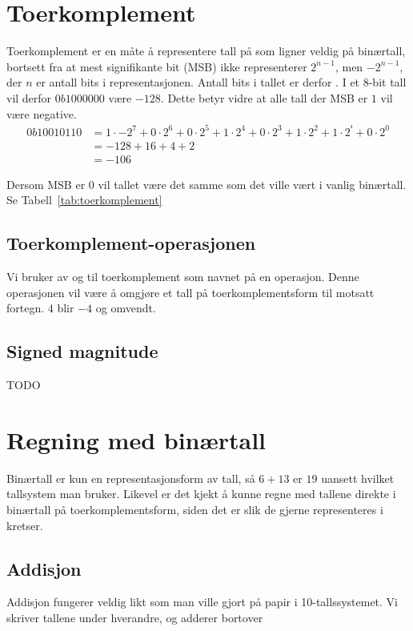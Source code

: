 \documentclass[12pt,a4paper,norsk]{article}
\begin{document}
\section{Toerkomplement}
Toerkomplement er en måte å representere tall på som ligner veldig på binærtall,
bortsett fra at mest signifikante bit (MSB) ikke representerer $2^{n-1}$, men
$-2^{n-1}$, der $n$ er antall bits i representasjonen. Antall bits i tallet er
derfor . I et 8-bit tall vil
derfor $0b1000000$ være $-128$. Dette betyr vidre at alle tall der MSB er $1$
vil være negative.
\begin{align*}
  0b10010110 &= 1 \cdot -2^7 + 0 \cdot 2^6 + 0 \cdot 2^5 + 1 \cdot 2^4 + 0 \cdot 2^3 + 1 \cdot 2^2 + 1 \cdot 2^¹ + 0 \cdot 2^0 \\
             &= -128 + 16 + 4 + 2 \\
             &= -106
\end{align*}

Dersom MSB er $0$ vil tallet være det samme som det ville vært i vanlig
binærtall. Se Tabell~\ref{tab:toerkomplement}

\subsection{Toerkomplement-operasjonen}
Vi bruker av og til toerkomplement som navnet på en operasjon. Denne operasjonen
vil være å omgjøre et tall på toerkomplementsform til motsatt fortegn. $4$ blir
$-4$ og omvendt. 

\subsection{Signed magnitude}
TODO

\section{Regning med binærtall}
Binærtall er kun en representasjonsform av tall, så $6+13$ er $19$ uansett
hvilket tallsystem man bruker. Likevel er det kjekt å kunne regne med tallene
direkte i binærtall på toerkomplementsform, siden det er slik de gjerne
representeres i kretser.

\subsection{Addisjon}
Addisjon fungerer veldig likt som man ville gjort på papir i 10-tallssystemet.
Vi skriver tallene under hverandre, og adderer bortover
\end{document}
